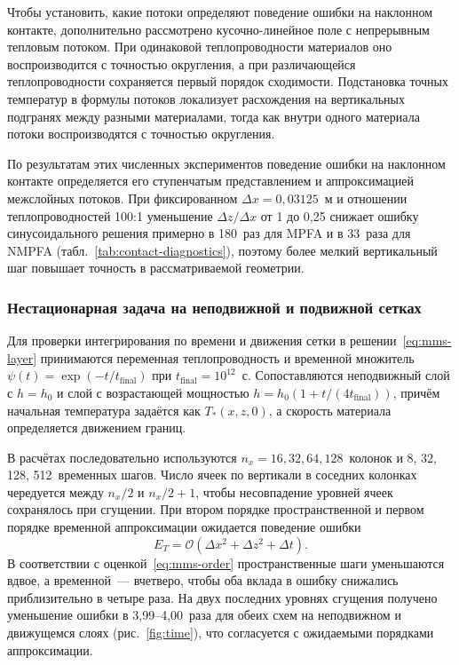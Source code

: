 Чтобы установить, какие потоки определяют поведение ошибки на наклонном контакте, дополнительно рассмотрено кусочно-линейное поле с непрерывным тепловым потоком. При одинаковой теплопроводности материалов оно воспроизводится с точностью округления, а при различающейся теплопроводности сохраняется первый порядок сходимости. Подстановка точных температур в формулы потоков локализует расхождения на вертикальных подгранях между разными материалами, тогда как внутри одного материала потоки воспроизводятся с точностью округления.

По результатам этих численных экспериментов поведение ошибки на наклонном контакте определяется его ступенчатым представлением и аппроксимацией межслойных потоков. При фиксированном $\Delta x=0{,}03125$~м и отношении теплопроводностей 100:1 уменьшение $\Delta z/\Delta x$ от 1 до 0,25 снижает ошибку синусоидального решения примерно в 180~раз для MPFA и в 33~раза для NMPFA (табл.~\ref{tab:contact-diagnostics}), поэтому более мелкий вертикальный шаг повышает точность в рассматриваемой геометрии.



\subsubsection{Нестационарная задача на неподвижной и подвижной сетках}

Для проверки интегрирования по времени и движения сетки в решении~\eqref{eq:mms-layer} принимаются переменная теплопроводность и временной множитель $\psi(t)=\exp(-t/t_{\mathrm{final}})$ при $t_{\mathrm{final}}=10^{12}$~с. Сопоставляются неподвижный слой с $h=h_0$ и слой с возрастающей мощностью $h=h_0(1+t/(4t_{\mathrm{final}}))$, причём начальная температура задаётся как $T_*(x,z,0)$, а скорость материала определяется движением границ.

В расчётах последовательно используются $n_x=16,32,64,128$~колонок и 8, 32, 128, 512~временных шагов. Число ячеек по вертикали в соседних колонках чередуется между $n_x/2$ и $n_x/2+1$, чтобы несовпадение уровней ячеек сохранялось при сгущении. При втором порядке пространственной и первом порядке временной аппроксимации ожидается поведение ошибки
\begin{equation}
 E_T = \mathcal O(\Delta x^2 + \Delta z^2 + \Delta t).
 \label{eq:mms-order}
\end{equation}
В соответствии с оценкой~\eqref{eq:mms-order} пространственные шаги уменьшаются вдвое, а временной~--- вчетверо, чтобы оба вклада в ошибку снижались приблизительно в четыре раза. На двух последних уровнях сгущения получено уменьшение ошибки в 3,99--4,00~раза для обеих схем на неподвижном и движущемся слоях (рис.~\ref{fig:time}), что согласуется с ожидаемыми порядками аппроксимации.

